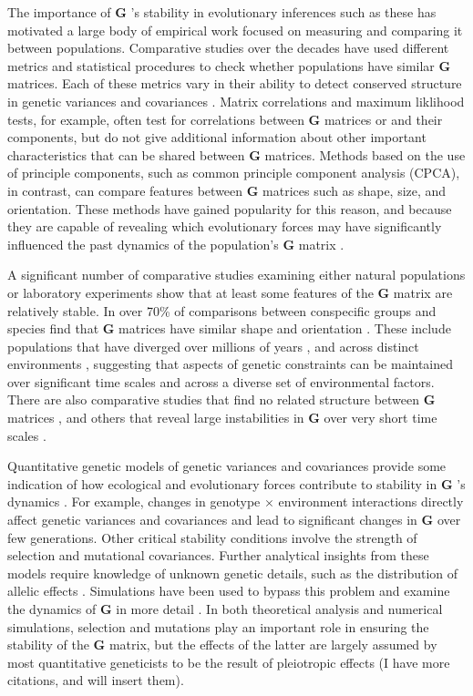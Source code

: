 \documentclass[9pt,twocolumn,twoside]{gsajnl}
\newcommand{\G}{\textbf{G }}
\begin{document}
The importance of \G's stability in evolutionary inferences such as these has motivated a large body of empirical work focused on measuring and comparing it between populations. Comparative studies over the decades have used different metrics and statistical procedures to check whether populations have similar \G matrices. Each of these metrics vary in their ability to detect conserved structure in genetic variances and covariances \cite{Steppan2002}. Matrix correlations and maximum liklihood tests, for example, often test for correlations between \G matrices or and their components, but do not give additional information about other important characteristics that can be shared between \G matrices. Methods based on the use of principle components, such as common principle component analysis (CPCA), in contrast, can compare features between \G matrices such as shape, size, and orientation. These methods have gained popularity for this reason, and because they are capable of revealing which evolutionary forces may have significantly influenced the past dynamics of the population's \G matrix \cite{Phillips1999,Arnold2008}. 

A significant number of comparative studies examining either natural populations or laboratory experiments show that at least some features of the \G matrix are relatively stable. In over 70\% of comparisons between conspecific groups and species find that \G matrices have similar shape and orientation \cite{Arnold2008}. These include populations that have diverged over millions of years \cite{Arnold1999}, and across distinct environments \cite{puentes2016similarity,teplitsky2014assessing}, suggesting that aspects of genetic constraints can be maintained over significant time scales and across a diverse set of environmental factors. There are also comparative studies that find no related structure between \G matrices \cite{wilkinson1990resistance,roff1999does,Steppan1997,Waldmann2000}, and others that reveal large instabilities in \G over very short time scales  \cite{bjorklund2013rapid,Siren2017}. 

Quantitative genetic models of genetic variances and covariances provide some indication of how ecological and evolutionary forces contribute to stability in \G's dynamics \citep{Turelli1988,barton1989evolutionary,reeve2000predicting}. For example, changes in genotype $\times$ environment interactions directly affect genetic variances and covariances and lead to significant changes in \G over few generations. Other critical stability conditions involve the strength of selection and mutational covariances. Further analytical insights from these models require knowledge of unknown genetic details, such as the distribution of allelic effects \cite{burger2000mathematical}. Simulations have been used to bypass this problem and examine the dynamics of \G in more detail \cite{Jones2003,Jones2007}. In both theoretical analysis and numerical simulations, selection and mutations play an important role in ensuring the stability of the \G matrix, but the effects of the latter are largely assumed by most quantitative geneticists to be the result of pleiotropic effects \cite{lande1979quantitative,lande1980genetic,Arnold2008}(I have more citations, and will insert them).
\end{document}
